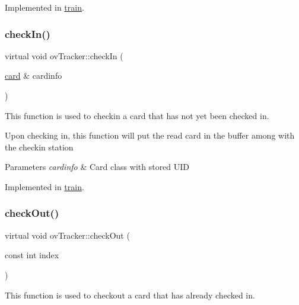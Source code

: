 Implemented in \hyperlink{classtrain_ab027ec1ad985772fbc8b5d65a34da7be}{train}.

\mbox{\label{classovTracker_a1d5cd8f5a6bd02c91d6d010f1a3839ce}} 
\subsubsection{\texorpdfstring{check\+In()}{checkIn()}}
{\footnotesize\ttfamily virtual void ov\+Tracker\+::check\+In (\begin{DoxyParamCaption}\item[{\hyperlink{classcard}{card} \&}]{cardinfo }\end{DoxyParamCaption})\hspace{0.3cm}{\ttfamily [pure virtual]}}



This function is used to checkin a card that has not yet been checked in. 

Upon checking in, this function will put the read card in the buffer among with the checkin station 
\begin{DoxyParams}{Parameters}
{\em cardinfo} & Card class with stored U\+ID \\
\hline
\end{DoxyParams}


Implemented in \hyperlink{classtrain_a1e0e594fdafed4ac60b5b6d81b91c2ca}{train}.

\mbox{\label{classovTracker_a96e808776b864290f742f271e18c401c}} 
\subsubsection{\texorpdfstring{check\+Out()}{checkOut()}}
{\footnotesize\ttfamily virtual void ov\+Tracker\+::check\+Out (\begin{DoxyParamCaption}\item[{const int}]{index }\end{DoxyParamCaption})\hspace{0.3cm}{\ttfamily [pure virtual]}}



This function is used to checkout a card that has already checked in. 

